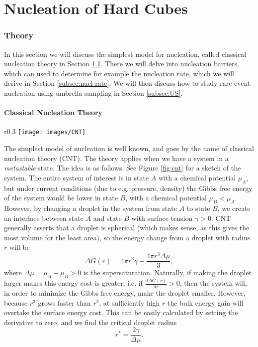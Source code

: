 \documentclass[thesis]{subfiles}
\begin{document}
\newpage

\part{Nucleation of Hard Cubes}

\section{Theory}

In this section we will discuss the simplest model for nucleation, called classical nucleation theory in Section \ref{subsec:cnt}. There we will delve into nucleation barriers, which can used to determine for example the nucleation rate, which we will derive in Section \ref{subsec:nucl rate}. We will then discuss how to study rare-event nucleation using umbrella sampling in Section \ref{subsec:US}.

\subsection{Classical Nucleation Theory}\label{subsec:cnt}

\begin{wrapfigure}{r}{0.3\textwidth}
	\centering
	\vspace{-10pt}
	\texttt{[image: images/CNT]}
	\caption{A cartoon of the system described by CNT.}\label{fig:cnt}
	\vspace{-10pt}
\end{wrapfigure}

The simplest model of nucleation is well known, and goes by the name of classical nucleation theory (CNT). The theory applies when we have a system in a \emph{metastable} state. The idea is as follows. See Figure \ref{fig:cnt} for a sketch of the system. The entire system of interest is in state $A$ with a chemical potential $\mu_A$, but under current conditions (due to e.g. pressure, density) the Gibbs free energy of the system would be lower in state $B$, with a chemical potential $\mu_B < \mu_A$. However, by changing a droplet in the system from state $A$ to state $B$, we create an interface between state $A$ and state $B$ with surface tension $\gamma > 0$. CNT generally asserts that a droplet is spherical (which makes sense, as this gives the most volume for the least area), so the energy change from a droplet with radius $r$ will be	
\begin{equation}
	\Delta G(r) = 4\pi r^2 \gamma - \frac{4\pi r^3 \Delta\mu}{3},
\end{equation}
where $\Delta\mu = \mu_A - \mu_B > 0$ is the supersaturation. Naturally, if making the droplet larger makes this energy cost is greater, i.e. if $\frac{d\Delta G(r)}{dr} > 0$, %
then the system will, in order to minimize the Gibbs free energy, make the droplet smaller. However, because $r^3$ grows faster than $r^2$, at sufficiently high $r$ the bulk energy gain will overtake the surface energy cost. This can be easily calculated by setting the derivative to zero, and we find the critical droplet radius
\begin{equation}
	r^* = \frac{2\gamma}{\Delta\mu}.
\end{equation}
\end{document}

